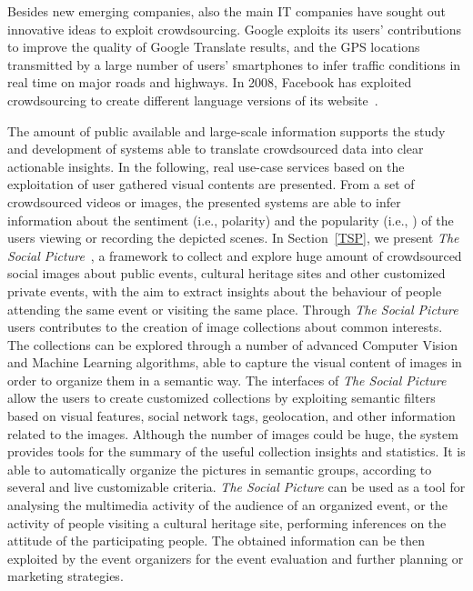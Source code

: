 Besides new emerging companies, also the main IT companies have sought out innovative ideas to exploit crowdsourcing. Google exploits its users' contributions to improve the quality of Google Translate results, and the GPS locations transmitted by a large number of users' smartphones to infer traffic conditions in real time on major roads and highways. 
In 2008, Facebook has exploited crowdsourcing to create different language versions of its website~\cite{dolmaya2011ethics}. %

The amount of public available and large-scale information supports the study and development of systems able to translate crowdsourced data into clear actionable insights.
In the following, real use-case services based on the exploitation of user gathered visual contents are presented. From a set of crowdsourced videos or images, the presented systems are able to infer information about the sentiment (i.e., polarity) and the popularity (i.e., ) of the users viewing or recording the depicted scenes.
In Section~\ref{TSP}, we present \textit{The Social Picture}~\cite{battiato2016social}, a framework to collect and explore huge amount of crowdsourced social images about public events, cultural heritage sites and other customized private events, with the aim to extract insights about the behaviour of people attending the same event or visiting the same place. 
Through \textit{The Social Picture} users contributes to the creation of image collections about common interests. %
The collections can be explored through a number of advanced Computer Vision and Machine Learning algorithms, able to capture the visual content of images in order to organize them in a semantic way. The interfaces of \textit{The Social Picture} allow the users to create customized collections by exploiting semantic filters based on visual features, social network tags, geolocation, and other information related to the images.
Although the number of images could be huge, the system provides tools for the summary of the useful collection insights and statistics. It is able to automatically organize the pictures in semantic groups, according to several and live customizable criteria.
\textit{The Social Picture} can be used as a tool for analysing the multimedia activity of the audience of an organized event, or the activity of people visiting a cultural heritage site, performing inferences on the attitude of the participating people. The obtained information can be then exploited by the event organizers for the event evaluation and further planning or marketing strategies.


